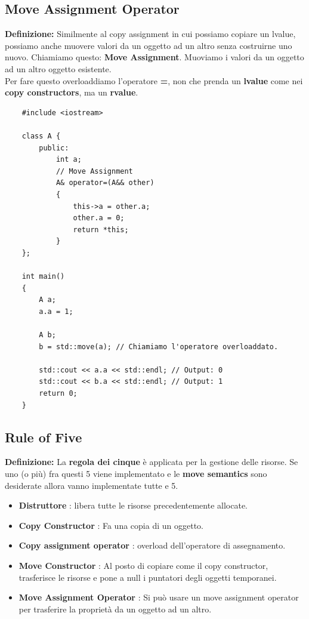 \subsection{Move Assignment Operator}

\textsf{\small \textbf{Definizione: } Similmente al copy assignment in cui possiamo copiare un lvalue, possiamo anche muovere valori da un oggetto ad un altro senza costruirne uno nuovo. Chiamiamo questo: \textbf{Move Assignment}. Muoviamo i valori da un oggetto ad un altro oggetto esistente.} \\

\textsf{\small Per fare questo overloaddiamo l'operatore \textbf{=}, non che prenda un \textbf{lvalue} come nei \textbf{copy constructors}, ma un \textbf{rvalue}.} \\

\begin{lstlisting}
	#include <iostream>
	
	class A {
		public:
			int a;
			// Move Assignment
			A& operator=(A&& other)
			{
				this->a = other.a;
				other.a = 0;
				return *this;
			}
	};

	int main()
	{
		A a;
		a.a = 1;
		
		A b;
		b = std::move(a); // Chiamiamo l'operatore overloaddato. 
		
		std::cout << a.a << std::endl; // Output: 0
		std::cout << b.a << std::endl; // Output: 1
		return 0;
	}
\end{lstlisting}

\subsection{Rule of Five}

\textsf{\small \textbf{Definizione: } La \textbf{regola dei cinque} è applicata per la gestione delle risorse. Se uno (o più) fra questi 5 viene implementato e le \textbf{move semantics} sono desiderate allora vanno implementate tutte e 5. } \\

\begin{itemize}
	\item \textsf{\small \textbf{Distruttore} : libera tutte le risorse precedentemente allocate.}
	\item \textsf{\small \textbf{Copy Constructor} : Fa una copia di un oggetto.}
	\item \textsf{\small \textbf{Copy assignment operator} : overload dell'operatore di assegnamento.}
	\item \textsf{\small \textbf{Move Constructor} : Al posto di copiare come il copy constructor, trasferisce le risorse e pone a null i puntatori degli oggetti temporanei.}
	\item \textsf{\small \textbf{Move Assignment Operator} : Si può usare un move assignment operator per trasferire la proprietà da un oggetto ad un altro.}
\end{itemize}

